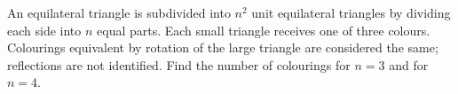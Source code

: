 An equilateral triangle is subdivided into $n^2$ unit equilateral triangles by dividing each side into $n$ equal parts. Each small triangle receives one of three colours. Colourings equivalent by rotation of the large triangle are considered the same; reflections are not identified. Find the number of colourings for $n=3$ and for $n=4$.
